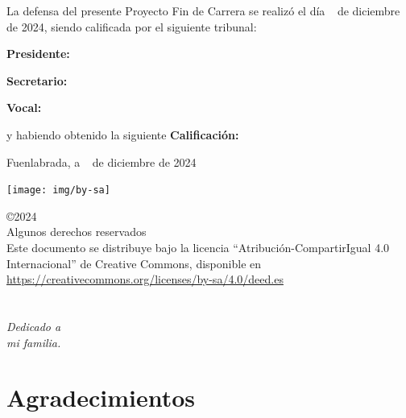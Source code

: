 \documentclass[a4paper, 12pt]{book}
\makeatletter
\let\theauthor\@author
\makeatother
\begin{document}
\vspace{0.8cm}
La defensa del presente Proyecto Fin de Carrera se realizó el día \qquad$\;\,$ de diciembre \newline de 2024, siendo calificada por el siguiente tribunal:


\vspace{0.5cm}
\textbf{Presidente:}

\vspace{1cm}
\textbf{Secretario:}

\vspace{1cm}
\textbf{Vocal:}


\vspace{1cm}
y habiendo obtenido la siguiente \textbf{Calificación:}


\vspace{1cm}
\begin{flushright}
  Fuenlabrada, a \qquad$\;\,$ de diciembre de 2024
\end{flushright}

\vspace{1cm}

\texttt{[image: img/by-sa]}

\noindent©2024 \theauthor  \\
Algunos derechos reservados  \\
Este documento se distribuye bajo la licencia ``Atribución-CompartirIgual 4.0 Internacional'' de Creative Commons, disponible en \\
\url{https://creativecommons.org/licenses/by-sa/4.0/deed.es}



\chapter*{}
\begin{flushright}
  \textit{Dedicado a \\
    mi familia.}
\end{flushright}


\chapter*{Agradecimientos}
\end{document}
